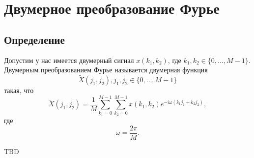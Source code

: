 \section{Двумерное преобразование Фурье}
\subsection{Определение}

\begin{definition}
Допустим у нас имеется двумерный сигнал $x\left(k_1, k_2\right)$, где 
$k_1,k_2 \in \{0, \dots, M - 1\}$. Двумерным преобразованием Фурье
называется двумерная функция 
\[
\tilde{X}\left(j_1, j_2\right), j_1,j_2
\in \{0, \dots, M - 1\}
\]
такая, что
\[
\tilde{X}\left(j_1, j_2\right) = 
\frac{1}{M}\sum_{k_1 = 0}^{M-1}\sum_{k_2 = 0}^{M-1}
x\left(k_1, k_2\right)e^{-i \omega\left(k_1 j_1 + k_2 j_2\right)},
\]
где
\[
\omega = \frac{2 \pi}{M}.
\]
\label{def:add:dsp:fourier2d}
\end{definition}

TBD
